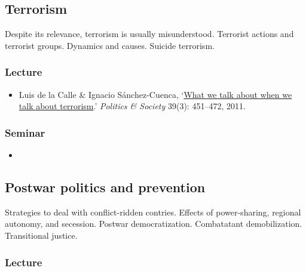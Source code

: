 \documentclass[12pt, a4paper]{article}
\begin{document}
\hline %

\subsection{Terrorism}\label{terrorism}

Despite its relevance, terrorism is usually misunderstood. Terrorist actions and terrorist groups. Dynamics and causes. Suicide terrorism.

\subsubsection*{Lecture}

\begin{itemize}
\setlength\itemsep{0pt}
\item Luis de la Calle \& Ignacio Sánchez-Cuenca, `\href{https://doi.org/10.1177/0032329211415506}{What we talk about when we talk about terrorism}.' \textit{Politics \& Society} 39(3): 451--472, 2011.
\end{itemize}

\subsubsection*{Seminar}

\begin{itemize}
\setlength\itemsep{0pt}
\item {}
\end{itemize}

\hline %

\subsection{Postwar politics and prevention}\label{postwar}

Strategies to deal with conflict-ridden contries. Effects of power-sharing, regional autonomy, and secession. Postwar democratization. Combatatant demobilization. Transitional justice.

\subsubsection*{Lecture}
\end{document}

